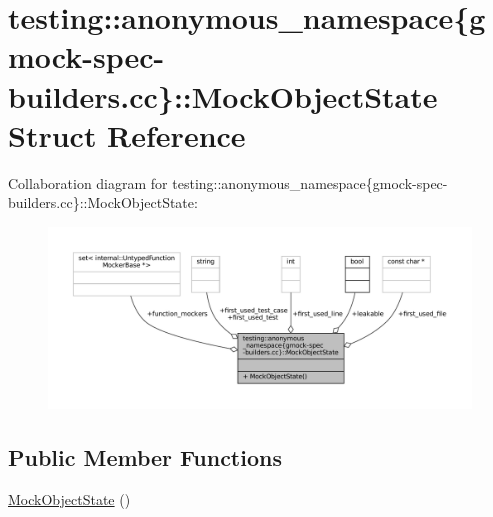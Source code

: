 \hypertarget{structtesting_1_1anonymous__namespace_02gmock-spec-builders_8cc_03_1_1MockObjectState}{}\section{testing\+:\+:anonymous\+\_\+namespace\{gmock-\/spec-\/builders.cc\}\+:\+:Mock\+Object\+State Struct Reference}
\label{structtesting_1_1anonymous__namespace_02gmock-spec-builders_8cc_03_1_1MockObjectState}


Collaboration diagram for testing\+:\+:anonymous\+\_\+namespace\{gmock-\/spec-\/builders.cc\}\+:\+:Mock\+Object\+State\+:
\nopagebreak
\begin{figure}[H]
\begin{center}
\leavevmode
\includegraphics[width=350pt]{structtesting_1_1anonymous__namespace_02gmock-spec-builders_8cc_03_1_1MockObjectState__coll__graph}
\end{center}
\end{figure}
\subsection*{Public Member Functions}
\begin{DoxyCompactItemize}
\item 
\hyperlink{structtesting_1_1anonymous__namespace_02gmock-spec-builders_8cc_03_1_1MockObjectState_a1cbe3e1f878f959091d0d0b0ec40fa45}{Mock\+Object\+State} ()
\end{DoxyCompactItemize}
